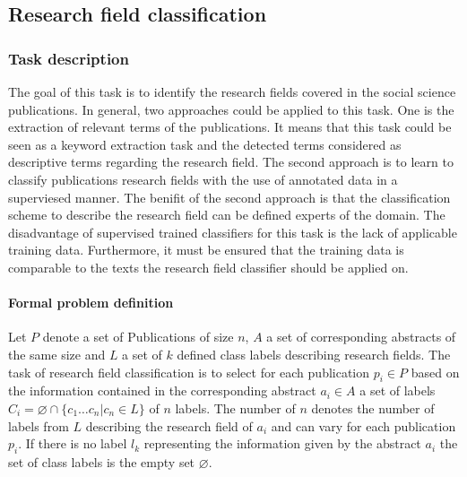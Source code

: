 
\subsection{Research field classification}
\label{sec:field_classification}
\subsubsection{Task description}
The goal of this task is to identify the research fields covered in the social science publications.
In general, two approaches could be applied to this task.
One is the extraction of relevant terms of the publications.
It means that this task could be seen as a keyword extraction task and the detected terms considered as descriptive terms regarding the research field.
The second approach is to learn to classify publications research fields with the use of annotated data in a superviesed manner.
The benifit of the second approach is that the classification scheme to describe the research field can be defined experts of the domain.
The disadvantage of supervised trained classifiers for this task is the lack of applicable training data.
Furthermore, it must be ensured that the training data is comparable to the texts the research field classifier should be applied on.

\paragraph{Formal problem definition}
Let $P$ denote a set of Publications of size $n$, $A$ a set of corresponding abstracts of the same size and $L$ a set of $k$ defined class labels describing research fields.
The task of research field classification is to select for each publication $p_i\in{P}$ based on the information contained in the corresponding abstract $a_i\in{A}$ a set of labels $C_i = \varnothing \cap \{c_1\dots c_n|c_n \in L\}$ of $n$ labels.
The number of $n$ denotes the number of labels from $L$ describing the research field of $a_i$ and can vary for each publication $p_i$.
If there is no label $l_k$ representing the information given by the abstract $a_i$ the set of class labels is the empty set $\varnothing$.




